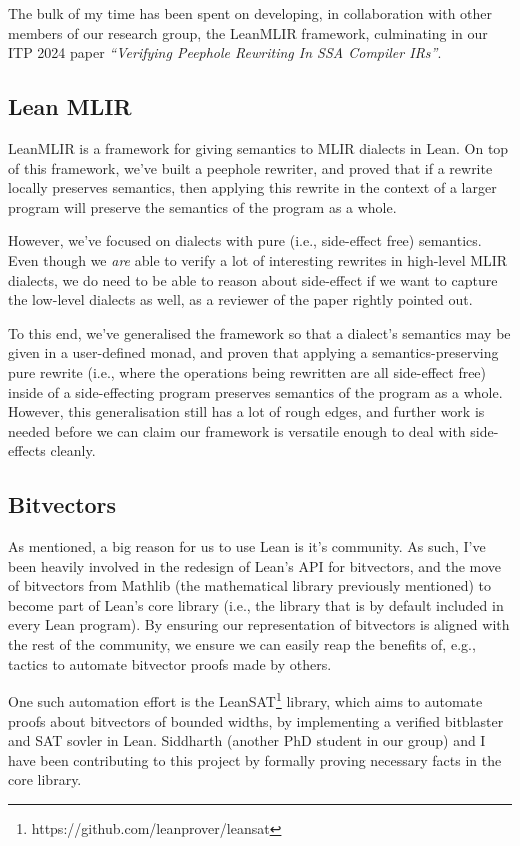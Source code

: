 \documentclass[a4paper]{scrartcl}
\begin{document}
The bulk of my time has been spent on developing, in collaboration with
other members of our research group, the LeanMLIR framework, culminating
in our ITP 2024 paper \emph{``Verifying Peephole Rewriting In SSA
Compiler IRs''}.


\subsection{Lean MLIR}\label{lean-mlir}

LeanMLIR is a framework for giving semantics to MLIR dialects in Lean.
On top of this framework, we've built a peephole rewriter, and proved
that if a rewrite locally preserves semantics, then applying this
rewrite in the context of a larger program will preserve the semantics
of the program as a whole.

However, we've focused on dialects with pure (i.e., side-effect free)
semantics. Even though we \emph{are} able to verify a lot of interesting
rewrites in high-level MLIR dialects, we do need to be able to reason
about side-effect if we want to capture the low-level dialects as well,
as a reviewer of the paper rightly pointed out.

To this end, we've generalised the framework so that a dialect's
semantics may be given in a user-defined monad, and proven that applying
a semantics-preserving pure rewrite (i.e., where the operations being
rewritten are all side-effect free) inside of a side-effecting program
preserves semantics of the program as a whole. However, this
generalisation still has a lot of rough edges, and further work is
needed before we can claim our framework is versatile enough to deal
with side-effects cleanly.


\subsection{Bitvectors}\label{bitvectors}

As mentioned, a big reason for us to use Lean is it's community. As
such, I've been heavily involved in the redesign of Lean's API for
bitvectors, and the move of bitvectors from Mathlib (the mathematical
library previously mentioned) to become part of Lean's core library
(i.e., the library that is by default included in every Lean program).
By ensuring our representation of bitvectors is aligned with the rest of
the community, we ensure we can easily reap the benefits of, e.g.,
tactics to automate bitvector proofs made by others.

One such automation effort is the LeanSAT\footnote{https://github.com/leanprover/leansat}
library, which aims to automate proofs about bitvectors of bounded
widths, by implementing a verified bitblaster and SAT sovler in Lean.
Siddharth (another PhD student in our group) and I have been
contributing to this project by formally proving necessary facts in the
core library.
\end{document}
